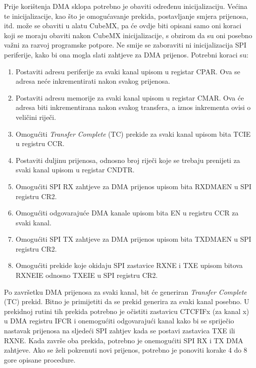 		Prije korištenja DMA sklopa potrebno je obaviti određenu inicijalizaciju. Većina te inicijalizacije, kao što je omogućavanje prekida, postavljanje smjera prijenosa, itd. može se obaviti u alatu CubeMX, pa će ovdje biti opisani samo oni koraci koji se moraju obaviti nakon CubeMX inicijalizacije, s obzirom da su oni posebno važni za razvoj programske potpore. Ne smije se zaboraviti ni inicijalizacija SPI periferije, kako bi ona mogla slati zahtjeve za DMA prijenos. Potrebni koraci su:
		\begin{enumerate}
			\item Postaviti adresu periferije za svaki kanal upisom u registar CPAR. Ova se adresa neće inkrementirati nakon svakog prijenosa.
			\item Postaviti adresu memorije za svaki kanal upisom u registar CMAR. Ova će adresa biti inkrementirana nakon svakog transfera, a iznos inkrementa ovisi o veličini riječi.
			\item Omogućiti \textit{Transfer Complete} (TC) prekide za svaki kanal upisom bita TCIE u registru CCR.
			\item Postaviti duljinu prijenosa, odnosno broj riječi koje se trebaju prenijeti za svaki kanal upisom u registar CNDTR.
			\item Omogućiti SPI RX zahtjeve za DMA prijenos upisom bita RXDMAEN u SPI registru CR2.
			\item Omogućiti odgovarajuće DMA kanale upisom bita EN u registru CCR za svaki kanal.
			\item Omogućiti SPI TX zahtjeve za DMA prijenos upisom bita TXDMAEN u SPI registru CR2.
			\item Omogućiti prekide koje okidaju SPI zastavice RXNE i TXE upisom bitova RXNEIE odnosno TXEIE u SPI registru CR2.
		\end{enumerate}
		
		Po završetku DMA prijenosa za svaki kanal, bit će generiran \textit{Transfer Complete} (TC) prekid. Bitno je primijetiti da se prekid generira za svaki kanal posebno. U prekidnoj rutini tih prekida potrebno je očistiti zastavicu CTCFIFx (za kanal x) u DMA registru IFCR i onemogućiti odgovarajući kanal kako bi se spriječio nastavak prijenosa na sljedeći SPI zahtjev kada se postavi zastavica TXE ili RXNE. Kada završe oba prekida, potrebno je onemogućiti SPI RX i TX DMA zahtjeve. Ako se želi pokrenuti novi prijenos, potrebno je ponoviti korake 4 do 8 gore opisane procedure.
		
		